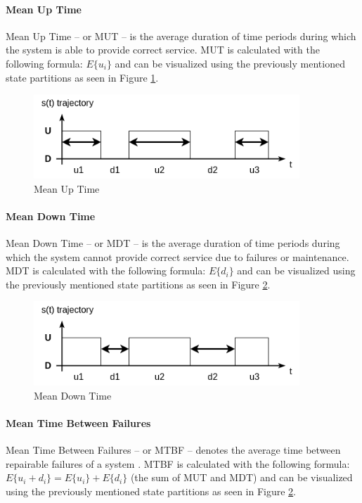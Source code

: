 \paragraph{Mean Up Time} Mean Up Time -- or MUT -- is the average duration of time periods during which the system is able to provide correct service. MUT is calculated with the following formula: \(E\{u_i\}\) and can be visualized using the previously mentioned state partitions as seen in Figure \ref{fig:mut}.

\begin{figure}[h]
	\centering
	\includegraphics[width=100mm, keepaspectratio]{figures/MUT.png}
	\caption{ Mean Up Time \cite{DependabilityBMEMIT} }
	\label{fig:mut}
\end{figure}

\paragraph{Mean Down Time} Mean Down Time -- or MDT -- is the average duration of time periods during which the system cannot provide correct service due to failures or maintenance. MDT is calculated with the following formula: \(E\{d_i\}\) and can be visualized using the previously mentioned state partitions as seen in Figure \ref{fig:mdt}.

\begin{figure}[h]
	\centering
	\includegraphics[width=100mm, keepaspectratio]{figures/MDT.png}
	\caption{ Mean Down Time \cite{DependabilityBMEMIT} }
	\label{fig:mdt}
\end{figure}

\paragraph{Mean Time Between Failures} Mean Time Between Failures -- or MTBF -- denotes the average time between repairable failures of a system \cite{KPIMetrics}. MTBF is calculated with the following formula: \(E\{u_i + d_i\} = E\{u_i\} + E\{d_i\}\) (the sum of MUT and MDT) and can be visualized using the previously mentioned state partitions as seen in Figure \ref{fig:mdt}.

